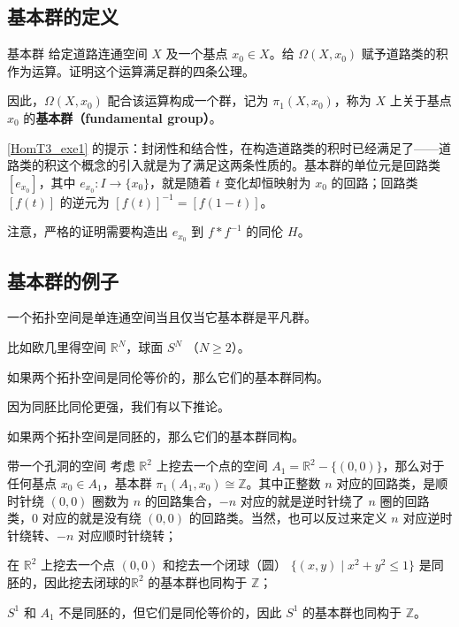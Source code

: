 \subsection{基本群的定义}

\begin{exercise}{基本群}\label{HomT3_exe1}
给定道路连通空间 $X$ 及一个基点 $x_0\in X$。给 $\Omega(X, x_0)$ 赋予道路类的积作为运算。证明这个运算满足群的四条公理。

因此，$\Omega(X, x_0)$ 配合该运算构成一个群，记为 $\pi_1(X, x_0)$，称为 $X$ 上关于基点 $x_0$ 的\textbf{基本群（fundamental group）}。
\end{exercise}

\autoref{HomT3_exe1} 的提示：封闭性和结合性，在构造道路类的积时已经满足了——道路类的积这个概念的引入就是为了满足这两条性质的。基本群的单位元是回路类 $[e_{x_0}]$，其中 $e_{x_0}: I\rightarrow\{x_0\}$，就是随着 $t$ 变化却恒映射为 $x_0$ 的回路；回路类 $[f(t)]$ 的逆元为 $[f(t)]^{-1}=[f(1-t)]$。

注意，严格的证明需要构造出 $e_{x_0}$ 到 $f*f^{-1}$ 的同伦 $H$。

\subsection{基本群的例子}

\begin{theorem}{}
一个拓扑空间是单连通空间当且仅当它基本群是平凡群。
\end{theorem}

比如欧几里得空间 $\mathbb{R}^N$，球面 $S^N$ （$N \geq 2$）。

\begin{theorem}{}
如果两个拓扑空间是同伦等价的，那么它们的基本群同构。
\end{theorem}

因为同胚比同伦更强，我们有以下推论。
\begin{corollary}{}
如果两个拓扑空间是同胚的，那么它们的基本群同构。
\end{corollary}

\begin{example}{带一个孔洞的空间}
考虑 $\mathbb{R}^2$ 上挖去一个点的空间 $A_1=\mathbb{R}^2-\{(0,0)\}$，那么对于任何基点 $x_0\in A_1$，基本群 $\pi_1(A_1, x_0) \cong \mathbb{Z}$。其中正整数 $n$ 对应的回路类，是顺时针绕 $(0,0)$ 圈数为 $n$ 的回路集合，$-n$ 对应的就是逆时针绕了 $n$ 圈的回路类，$0$ 对应的就是没有绕 $(0,0)$ 的回路类。当然，也可以反过来定义 $n$ 对应逆时针绕转、$-n$ 对应顺时针绕转；

在 $\mathbb{R}^2$ 上挖去一个点 $(0, 0)$ 和挖去一个闭球（圆） $\{(x, y) \mid  x^2 + y^2 \leq 1\}$ 是同胚的，因此挖去闭球的$\mathbb{R}^2$ 的基本群也同构于 $\mathbb{Z}$；

$S^1$ 和 $A_1$ 不是同胚的，但它们是同伦等价的，因此 $S^1$ 的基本群也同构于 $\mathbb{Z}$。
\end{example}

